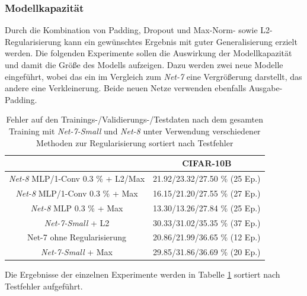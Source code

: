 \subsubsection{Modellkapazität}
Durch die Kombination von Padding, Dropout und Max-Norm- sowie L2-Regularisierung kann ein gewünschtes Ergebnis mit guter Generalisierung erzielt werden. Die folgenden Experimente sollen die Auswirkung der Modellkapazität und damit die Größe des Modells aufzeigen. Dazu werden zwei neue Modelle eingeführt, wobei das ein im Vergleich zum \textit{Net-7} eine Vergrößerung darstellt, das andere eine Verkleinerung. Beide neuen Netze verwenden ebenfalls Ausgabe-Padding.

\begin{table}
\centering
\begin{tabular}{c|c}
															& CIFAR-10B						 	\\ 
\hline \textit{Net-8} MLP/1-Conv 0.3 \% + L2/Max	& 	21.92/23.32/27.50 \%	 	(25 Ep.)	\\ %
\hline \textit{Net-8} MLP/1-Conv 0.3 \% + Max		& 	16.15/21.20/27.55 \%	 	(27 Ep.)	\\
\hline \textit{Net-8} MLP 0.3 \% + Max				& 	13.30/13.26/27.84 \%	 	(25 Ep.)	\\
\hline \textit{Net-7-Small}	+ L2							& 	30.33/31.02/35.35 \% 		(37 Ep.)	\\
\hline Net-7 ohne Regularisierung							& 	20.86/21.99/36.65 \%		(12 Ep.)	\\
\hline \textit{Net-7-Small}	+ Max							& 	29.85/31.86/36.69 \% 		(20 Ep.)	\\
\end{tabular} 
\caption{Fehler auf den Trainings-/Validierungs-/Testdaten nach dem gesamten Training mit \textit{Net-7-Small} und \textit{Net-8} unter Verwendung verschiedener Methoden zur Regularisierung sortiert nach Testfehler}
\label{tab:6_regularisierung2}
\end{table}

Die Ergebnisse der einzelnen Experimente werden in Tabelle \ref{tab:6_regularisierung2} sortiert nach Testfehler aufgeführt. \\

